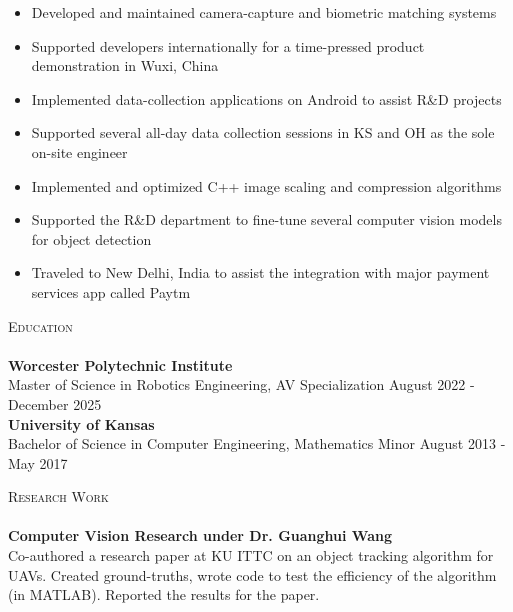 \documentclass[a4paper]{article}
\newcommand{\lineunder} {
    \vspace*{-8pt} \\
    \hspace*{-18pt} \hrulefill \\
}
\newcommand{\header} [1] {
    {\hspace*{-18pt}\vspace*{6pt} \textsc{#1}}
    \vspace*{-6pt} \lineunder
}
\begin{document}
\vspace{-1mm}
\begin{itemize} \itemsep 1pt
	\item Developed and maintained camera-capture and biometric matching systems
	\item Supported developers internationally for a time-pressed product demonstration in Wuxi, China
	\item Implemented data-collection applications on Android to assist R\&D projects
	\item Supported several all-day data collection sessions in KS and OH as the sole on-site engineer
	\item Implemented and optimized C++ image scaling and compression algorithms
	\item Supported the R\&D department to fine-tune several computer vision models for object detection
	\item Traveled to New Delhi, India to assist the integration with major payment services app called Paytm
\end{itemize}

\header{Education}
\textbf{Worcester Polytechnic Institute}\\
Master of Science in Robotics Engineering, AV Specialization \hfill August 2022 - December 2025\\
\vspace{2mm}
\textbf{University of Kansas}\\
Bachelor of Science in Computer Engineering, Mathematics Minor \hfill August 2013 - May 2017\\
\vspace{2mm}

\header{Research Work}
{\textbf{Computer Vision Research under Dr. Guanghui Wang}}\\
Co-authored a research paper at KU ITTC on an object tracking algorithm for UAVs. Created ground-truths, wrote code to test the efficiency of the algorithm (in MATLAB). Reported the results for the paper.\\
\vspace*{2mm}



\ 
\end{document}
